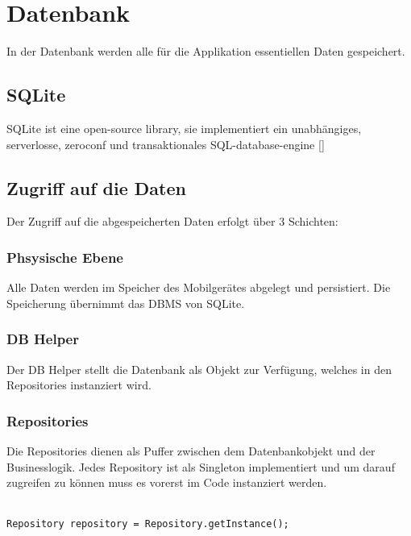 \documentclass[FIPLY_base.tex]{subfiles}
\author{Gerald Irsiegler}
\date{26. Februar 2016}
\begin{document}
\section{Datenbank}

In der Datenbank werden alle für die Applikation essentiellen Daten gespeichert.

\subsection{SQLite}
SQLite ist eine open-source library, sie implementiert ein unabhängiges, serverlosse, zeroconf und transaktionales SQL-database-engine [\cite{dbSQLite}]


\subsection{Zugriff auf die Daten}
Der Zugriff auf die abgespeicherten Daten erfolgt über 3 Schichten:

\subsubsection{Phsysische Ebene}
Alle Daten werden im Speicher des Mobilgerätes abgelegt und persistiert. Die Speicherung übernimmt das DBMS von SQLite.

\subsubsection{DB Helper}
Der DB Helper stellt die Datenbank als Objekt zur Verfügung, welches in den Repositories instanziert wird.


\newpage
\subsubsection{Repositories}
Die Repositories dienen als Puffer zwischen dem Datenbankobjekt und der Businesslogik.
Jedes Repository ist als Singleton implementiert und um darauf zugreifen zu können muss es vorerst im Code instanziert werden.
\\\
\begin{lstlisting}
Repository repository = Repository.getInstance();
\end{lstlisting}
\end{document}
